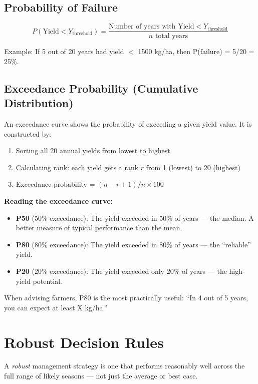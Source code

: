 \subsection{Probability of Failure}

\[
P(\text{Yield} < Y_{\text{threshold}}) = \frac{\text{Number of years with Yield} < Y_{\text{threshold}}}{n \text{ total years}}
\]

Example: If 5 out of 20 years had yield $<$ 1500 kg/ha, then P(failure) = 5/20 = 25\%.

\subsection{Exceedance Probability (Cumulative Distribution)}

An exceedance curve shows the probability of exceeding a given yield value. It is constructed by:

\begin{enumerate}
  \item Sorting all 20 annual yields from lowest to highest
  \item Calculating rank: each yield gets a rank $r$ from 1 (lowest) to 20 (highest)
  \item Exceedance probability = $(n - r + 1) / n \times 100$
\end{enumerate}

\begin{keyconceptbox}
\textbf{Reading the exceedance curve:}
\begin{itemize}
  \item \textbf{P50} (50\% exceedance): The yield exceeded in 50\% of years --- the median. A better measure of typical performance than the mean.
  \item \textbf{P80} (80\% exceedance): The yield exceeded in 80\% of years --- the ``reliable'' yield.
  \item \textbf{P20} (20\% exceedance): The yield exceeded only 20\% of years --- the high-yield potential.
\end{itemize}
When advising farmers, P80 is the most practically useful: ``In 4 out of 5 years, you can expect at least X kg/ha.''
\end{keyconceptbox}

\section{Robust Decision Rules}

A \emph{robust} management strategy is one that performs reasonably well across the full range of likely seasons --- not just the average or best case.

